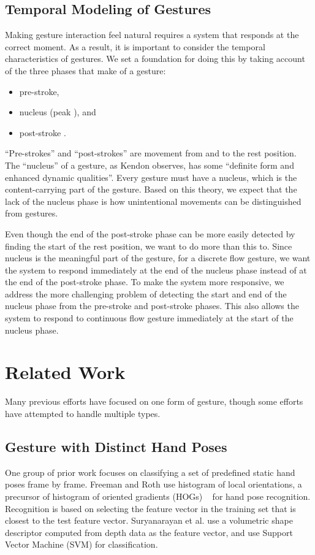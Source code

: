 \subsection{Temporal Modeling of Gestures}
Making gesture interaction feel natural requires a system that responds at the
correct moment. As a result, it is important to consider the temporal
characteristics of gestures. We set a foundation for doing this by taking
account of the three phases that make of a gesture:
\begin{itemize}
  \item pre-stroke,
  \item nucleus (peak \cite{mcneill82}), and
  \item post-stroke \cite{Pavlovic97}.
\end{itemize}

``Pre-strokes'' and ``post-strokes'' are movement from and to the
rest position. The ``nucleus'' of a gesture,
as Kendon \cite{kendon86} observes, has some ``definite form and enhanced dynamic
qualities''. Every gesture must have a nucleus, which is the content-carrying
part of the gesture. Based on this theory, we expect that the lack of the
nucleus phase is how unintentional movements can be distinguished from gestures. 

Even though the end of the
post-stroke phase can be more easily detected by finding the start of the
rest position, we want to do more than this to. Since nucleus is the meaningful
part of the gesture, for a discrete flow gesture, we want the system to respond immediately at the end of the nucleus
phase instead of at the end of the post-stroke phase. To make the system more responsive,
we address the more challenging problem of detecting the start and end of the nucleus phase from the pre-stroke
and post-stroke phases. This also allows the system to respond to continuous
flow gesture immediately at the start of the nucleus phase.

\section{Related Work}\label{sec:related}
Many previous efforts have focused on one form of
gesture, though some efforts have attempted to handle multiple types.

\subsection{Gesture with Distinct Hand Poses}
One group of prior work focuses on classifying a set of predefined static hand
poses frame by frame. Freeman and Roth \cite{freeman95} use histogram of local
orientations, a precursor of histogram of oriented gradients (HOGs)
~\cite{dalal05}
for hand pose recognition.
Recognition is based on selecting the feature vector in the training set that is closest to the test feature vector. Suryanarayan et al. \cite{suryanarayan2010} use a volumetric shape
descriptor computed from depth data as the feature vector, and use Support
Vector Machine (SVM) for classification.

